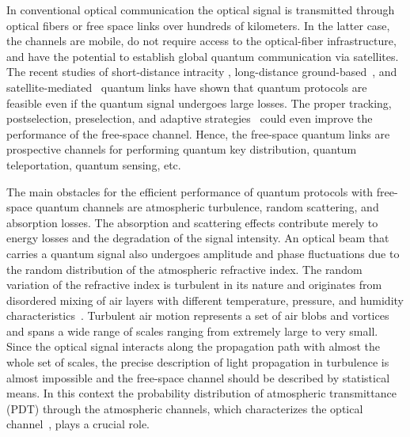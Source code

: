 \documentclass[aps,pra,twocolumn,a4paper,nofootinbib,preprintnumbers] {revtex4-1}
\begin{document}
	In conventional optical communication the optical signal is transmitted through optical fibers or free space links over hundreds of kilometers.
	In the latter case, the channels are mobile, do not require  access to the optical-fiber infrastructure, and have the potential to establish global quantum communication via satellites.
	The recent  studies of short-distance intracity \cite{Resch, Martinez, Peuntinger, Krenn, Croal, Vasylyev2017}, long-distance ground-based~\cite{Manderbach, Fedrizzi2009, Yin, Ma2012,  Capraro, Herbst, Krenn2016}, and satellite-mediated~\cite{Rarity, Scott, Wang, Bourgoin, Vallone2015, Vallone2016, Yin2017, Guenthner, Liao, GangRen, Takenaka, Liao2018}  quantum links   have shown that quantum protocols are feasible even if the quantum signal undergoes large losses.
	The proper tracking, postselection, preselection, and adaptive strategies~\cite{Elser, Erven, Usenko, Semenov2012, Bourgoin2015, Gruneisen, Bohmann2016} could even improve the performance of the free-space channel.
	Hence, the free-space quantum links are prospective channels for performing quantum key distribution, quantum teleportation, quantum sensing, etc.

	The main obstacles for the efficient performance of quantum protocols with free-space quantum channels are atmospheric turbulence, random scattering, and absorption losses.
	The absorption and scattering effects contribute merely to energy losses and the degradation of the signal intensity.
	An optical beam  that carries a quantum signal also undergoes  amplitude  and phase fluctuations due to the random distribution  of the atmospheric refractive  index.
	The random variation of the refractive index is turbulent in its nature and originates from disordered   mixing of air layers with different temperature, pressure, and humidity characteristics~\cite{Tatarskii, Andrews}.
	Turbulent air motion represents a set of air blobs and vortices and spans a wide range of scales ranging from extremely large to very small.
	Since the optical signal interacts along the propagation path with almost the  whole set of scales, the precise description of light propagation in turbulence is almost impossible and the free-space channel should be described by statistical means.
	In this context the probability distribution of atmospheric transmittance (PDT) through the atmospheric channels, which characterizes the optical channel~\cite{Vasylyev2012, Vasylyev2016}, plays a crucial role.
\end{document}
